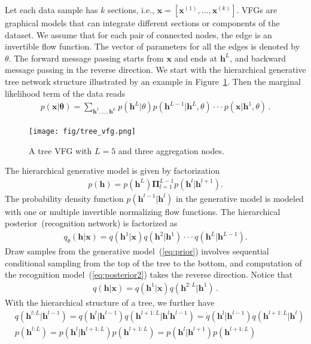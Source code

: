 \documentclass[sigconf, anonymous, review]{acmart}
\theoremstyle{plain}
\theoremstyle{definition}
\theoremstyle{remark}
\begin{document}
Let each data sample has $k$ sections, i.e., $\mathbf{x} = [\mathbf{x}^{(1)}, ..., \mathbf{x}^{(k)}]$. VFGs are graphical models that can integrate different sections or components of the dataset.  We assume that for each pair of connected nodes, the edge is an invertible flow function. 
The vector of parameters for all the edges is denoted by $\theta$. 
The forward message passing starts from $\mathbf{x}$ and ends at $\mathbf{h}^L$, and backward message passing in the reverse direction. We start with the hierarchical generative tree network structure illustrated by an example in Figure~\ref{fig:tree_vfg}. 
Then the marginal likelihood term of the data reads
\begin{align*}
p(\mathbf{x}| \mathbf{\theta}) = \sum_{\mathbf{h}^1, ..., \mathbf{h}^L} p(\mathbf{h}^L | \theta)p(\mathbf{h}^{L-1} | \mathbf{h}^{L},\theta) \cdot \cdot  \cdot  p(\mathbf{x} | \mathbf{h}^{1}, \theta) \, .
\end{align*}
\begin{figure}[H]
    \centering
    \texttt{[image: fig/tree\_vfg.png]}
    \caption{A  tree VFG with $L=5$ and three aggregation nodes.}
    \label{fig:tree_vfg}
\end{figure}
\noindent The hierarchical generative model is given by factorization
\begin{align}\label{eq:prior}
p(\mathbf{h}) =  p( \mathbf{h}^{L})\mathbf{\Pi}_{l=1}^{L-1}p(\mathbf{h}^{l} | \mathbf{h}^{l+1}) .
\end{align}
The probability density function $p(\mathbf{h}^{l-1} | \mathbf{h}^{l})$ in the generative model is modeled with one or multiple invertible normalizing flow functions. The hierarchical posterior~(recognition network) is factorized as
\begin{align}\label{eq:posterior2}
q_{\theta}(\mathbf{h}| \mathbf{x}) =  q(\mathbf{h}^1 | \mathbf{x})  q(\mathbf{h}^2 | \mathbf{h}^1) \cdot \cdot  \cdot  q(\mathbf{h}^{L} | \mathbf{h}^{L-1}).
\end{align}
Draw samples from the generative model~(\ref{eq:prior})
involves sequential conditional sampling from the top of the tree to the bottom, and computation of the recognition model~(\ref{eq:posterior2}) takes the reverse direction. Notice that
\begin{align*} %
q(\mathbf{h}| \mathbf{x}) = q(\mathbf{h}^1 | \mathbf{x})  q(\mathbf{h}^{2:L} | \mathbf{h}^1) \, .
\end{align*}
With the hierarchical structure of a tree, we further have
\begin{align} \label{eq:chain_post}
&q(\mathbf{h}^{l:L}|\mathbf{h}^{l-1}) = q(\mathbf{h}^{l}|\mathbf{h}^{l-1}) q(\mathbf{h}^{l+1:L}|\mathbf{h}^{l}\mathbf{h}^{l-1}) =q(\mathbf{h}^{l}|\mathbf{h}^{l-1}) q(\mathbf{h}^{l+1:L}|\mathbf{h}^{l})  \\ \label{eq:chain_prior}
& p(\mathbf{h}^{l:L})=  p(\mathbf{h}^{l}|\mathbf{h}^{l+1:L})p(\mathbf{h}^{l+1:L})=p(\mathbf{h}^{l}|\mathbf{h}^{l+1})p(\mathbf{h}^{l+1:L})
\end{align}
\end{document}
